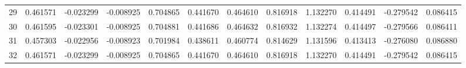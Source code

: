 \begin{landscape}
\begin{longtable}{rlllllllllll}
29 & 0.461571 & -0.023299 & -0.008925 & 0.704865 & 0.441670 & 0.464610 & 0.816918 & 1.132270 & 0.414491 & -0.279542 & 0.086415 \\
30 & 0.461595 & -0.023301 & -0.008925 & 0.704881 & 0.441686 & 0.464632 & 0.816932 & 1.132274 & 0.414497 & -0.279566 & 0.086411 \\
31 & 0.457303 & -0.022956 & -0.008923 & 0.701984 & 0.438611 & 0.460774 & 0.814629 & 1.131596 & 0.413413 & -0.276080 & 0.086880 \\
32 & 0.461571 & -0.023299 & -0.008925 & 0.704865 & 0.441670 & 0.464610 & 0.816918 & 1.132270 & 0.414491 & -0.279542 & 0.086415 \\
\bottomrule
\end{longtable}
\end{landscape}
